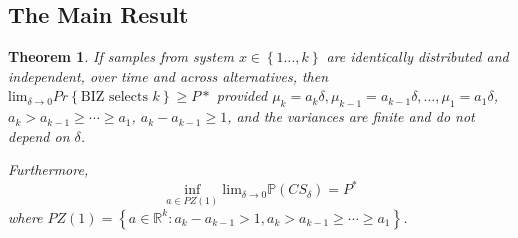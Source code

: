 \documentclass{wscpaperproc}
\theoremstyle{wsc}
\newtheorem{theorem}{Theorem}
\begin{document}
\subsection{The Main Result}

\begin{theorem}
If samples from system $x\in\left\{ 1\ldots,k\right\} $ are identically
distributed and independent, over time and across alternatives, then
$\mbox{lim}_{\delta\rightarrow0}Pr\left\{ \mbox{BIZ selects }k\right\} \geq P*$
provided $\mu_{k}=a_{k}\delta,\mu_{k-1}=a_{k-1}\delta,\ldots,\mu_{1}=a_{1}\delta$,
$a_{k}>a_{k-1}\geq \cdots \geq a_{1}$, $a_{k}-a_{k-1}\ge1$, and the variances are finite and
do not depend on $\delta$.

Furthermore,
\[
\inf_{a\in PZ\left(1\right)}\mbox{lim}_{\delta\rightarrow0}\mathbb{P}\left(CS_{\delta}\right)=P^{*}
\]
where $PZ\left(1\right)=\left\{ a\in\mathbb{R}^{k}:a_{k}-a_{k-1}>1, a_{k}>a_{k-1}\geq \cdots \geq a_{1} \right\} $. 

\end{theorem}




%


\[
\]
\end{document}
